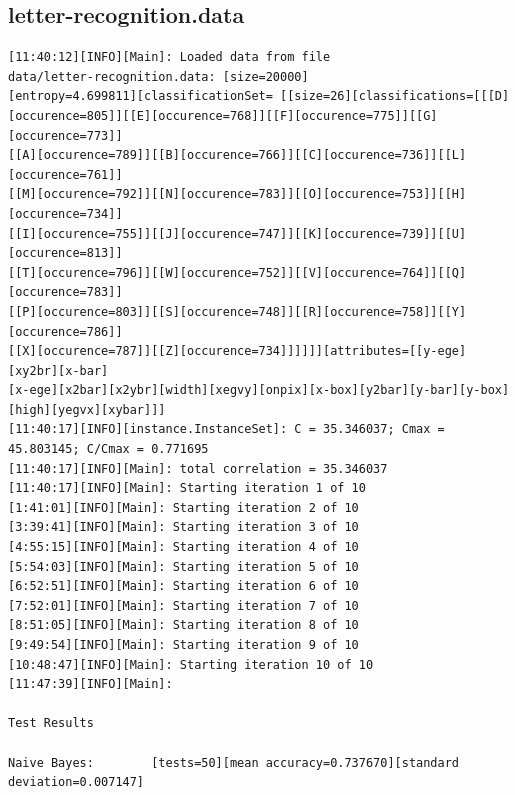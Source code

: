 \documentclass[10pt]{report}
\begin{document}
\subsection*{letter-recognition.data}
{\small
\begin{verbatim}
[11:40:12][INFO][Main]: Loaded data from file
data/letter-recognition.data: [size=20000]
[entropy=4.699811][classificationSet= [[size=26][classifications=[[[D]
[occurence=805]][[E][occurence=768]][[F][occurence=775]][[G][occurence=773]]
[[A][occurence=789]][[B][occurence=766]][[C][occurence=736]][[L][occurence=761]]
[[M][occurence=792]][[N][occurence=783]][[O][occurence=753]][[H][occurence=734]]
[[I][occurence=755]][[J][occurence=747]][[K][occurence=739]][[U][occurence=813]]
[[T][occurence=796]][[W][occurence=752]][[V][occurence=764]][[Q][occurence=783]]
[[P][occurence=803]][[S][occurence=748]][[R][occurence=758]][[Y][occurence=786]]
[[X][occurence=787]][[Z][occurence=734]]]]]][attributes=[[y-ege][xy2br][x-bar]
[x-ege][x2bar][x2ybr][width][xegvy][onpix][x-box][y2bar][y-bar][y-box][high][yegvx][xybar]]] 
[11:40:17][INFO][instance.InstanceSet]: C = 35.346037; Cmax = 45.803145; C/Cmax = 0.771695 
[11:40:17][INFO][Main]: total correlation = 35.346037 
[11:40:17][INFO][Main]: Starting iteration 1 of 10 
[1:41:01][INFO][Main]: Starting iteration 2 of 10 
[3:39:41][INFO][Main]: Starting iteration 3 of 10 
[4:55:15][INFO][Main]: Starting iteration 4 of 10 
[5:54:03][INFO][Main]: Starting iteration 5 of 10 
[6:52:51][INFO][Main]: Starting iteration 6 of 10 
[7:52:01][INFO][Main]: Starting iteration 7 of 10 
[8:51:05][INFO][Main]: Starting iteration 8 of 10 
[9:49:54][INFO][Main]: Starting iteration 9 of 10 
[10:48:47][INFO][Main]: Starting iteration 10 of 10 
[11:47:39][INFO][Main]: 

Test Results

Naive Bayes:		[tests=50][mean accuracy=0.737670][standard deviation=0.007147] 

\end{verbatim}
}
\end{document}
